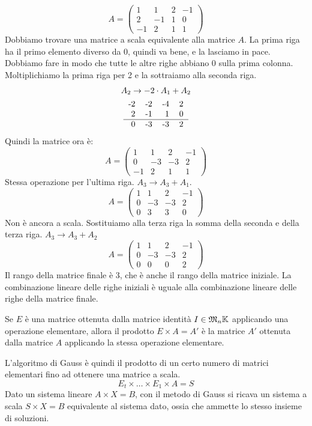 \begin{exmp}
\[
A = 
\begin{pmatrix}
1 & 1 & 2 & -1 \\ 
2 & -1 & 1 & 0 \\ 
-1 & 2 & 1 & 1
\end{pmatrix}
\]
Dobbiamo trovare una matrice a scala equivalente alla matrice $A$. La prima riga ha il primo elemento diverso da 0, quindi va bene, e la lasciamo in pace. Dobbiamo fare in modo che tutte le altre righe abbiano 0 sulla prima colonna. Moltiplichiamo la prima riga per 2 e la sottraiamo alla seconda riga.
\begin{gather*}
A_2 \to -2 \cdot A_1 + A_2 \\
\begin{tabular}{rrrr}
-2 & -2 & -4 & 2 \\
2 & -1 & 1 & 0 \\
\hline
0 & -3 & -3 & 2
\end{tabular}
\end{gather*}
Quindi la matrice ora \`e:
\[
A =
\begin{pmatrix}
1 & 1 & 2 & -1 \\ 
0 & -3 & -3 & 2 \\ 
-1 & 2 & 1 & 1
\end{pmatrix}\]
Stessa operazione per l'ultima riga. $A_3 \to A_3 + A_1$.
\[
A = 
\begin{pmatrix}
1 & 1 & 2 & -1 \\ 
0 & -3 & -3 & 2 \\ 
0 & 3 & 3 & 0
\end{pmatrix}
\]
Non \`e ancora a scala. Sostituiamo alla terza riga la somma della seconda e della terza riga. $A_3 \to A_3 + A_2$
\[
A = 
\begin{pmatrix}
1 & 1 & 2 & -1 \\ 
0 & -3 & -3 & 2 \\ 
0 & 0 & 0 & 2
\end{pmatrix}
\]
Il rango della matrice finale \`e 3, che \`e anche il rango della matrice iniziale. La combinazione lineare delle righe iniziali \`e uguale alla combinazione lineare delle righe della matrice finale.
\end{exmp}
\begin{oss}
Se $E$ \`e una matrice ottenuta dalla matrice identit\`a $I \in \mathfrak{M}_n {\mathbb{K}}$ applicando una operazione elementare, allora il prodotto $E \times A = A'$ \`e la matrice $A'$ ottenuta dalla matrice $A$ applicando la stessa operazione elementare.
\end{oss}
L'algoritmo di Gauss \`e quindi il prodotto di un certo numero di matrici elementari fino ad ottenere una matrice a scala.
\[
E_t \times \ldots \times E_1 \times A = S
\]
Dato un sistema lineare $A \times X = B$, con il metodo di Gauss si ricava un sistema a scala $S \times X = B$ equivalente al sistema dato, ossia che ammette lo stesso insieme di soluzioni.

